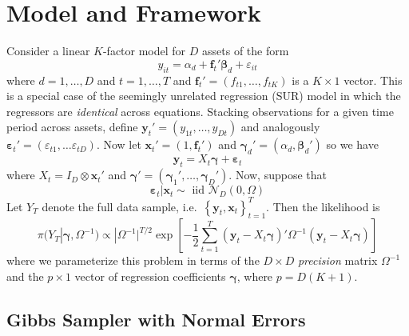 \documentclass[12pt]{article}
\begin{document}
\section{Model and Framework}
Consider a linear $K$-factor model for $D$ assets of the form
\begin{equation*}
y_{it}=\alpha _{d} + \mathbf{f}_{t}' \boldsymbol{\beta}_d + \varepsilon_{it}
\end{equation*}
where $d = 1, \hdots, D$ and $t = 1, \hdots, T$ and $\mathbf{f}_{t}'=\left(f_{t1}, \hdots,f_{tK}\right)$ is a $K\times1$ vector.
This is a special case of the seemingly unrelated regression (SUR) model in which the regressors are \emph{identical} across equations.
Stacking observations for a given time period across assets, define $\mathbf{y}_t' = (y_{1t}, \hdots, y_{Dt})$ and analogously $\boldsymbol{\varepsilon}_t' = \left( \varepsilon_{t1}, \hdots \varepsilon_{tD} \right)$.
Now let $\mathbf{x}_t' = (1, \mathbf{f}_t')$ and $\boldsymbol{\gamma}_d' = (\alpha_d, \boldsymbol{\beta}_d')$ so we have
\begin{equation*}
\mathbf{y}_t = X_t \boldsymbol{\gamma} + \boldsymbol{\varepsilon}_t
\end{equation*}
where $X_t = I_D \otimes \mathbf{x}_t'$ and $\boldsymbol{\gamma}'= \left( \boldsymbol{\gamma}_1', \hdots, \boldsymbol{\gamma}_D' \right)$. 
Now, suppose that 
\begin{equation*}
\boldsymbol{\varepsilon}_t|\mathbf{x}_t \sim \mbox{ iid } \mathcal{N}_D(0, \Omega)
\end{equation*}
Let $Y_T$ denote the full data sample, i.e.\ $\left\{ \mathbf{y}_t, \mathbf{x}_t \right\}_{t=1}^T$.
Then the likelihood is 
\begin{equation*}
\pi(Y_T|\boldsymbol{\gamma},\Omega^{-1}) \propto |\Omega^{-1}|^{T/2} \exp\left[ -\frac{1}{2} \sum_{t=1}^T \left(\mathbf{y}_t - X_t \boldsymbol{\gamma} \right)' \Omega^{-1} \left(\mathbf{y}_t - X_t \boldsymbol{\gamma} \right)\right]
\end{equation*}
where we parameterize this problem in terms of the $D\times D$ \emph{precision} matrix $\Omega^{-1}$ and the $p\times1$ vector of regression coefficients $\boldsymbol{\gamma}$, where $p = D(K+1)$.
\subsection{Gibbs Sampler with Normal Errors}
\end{document}
